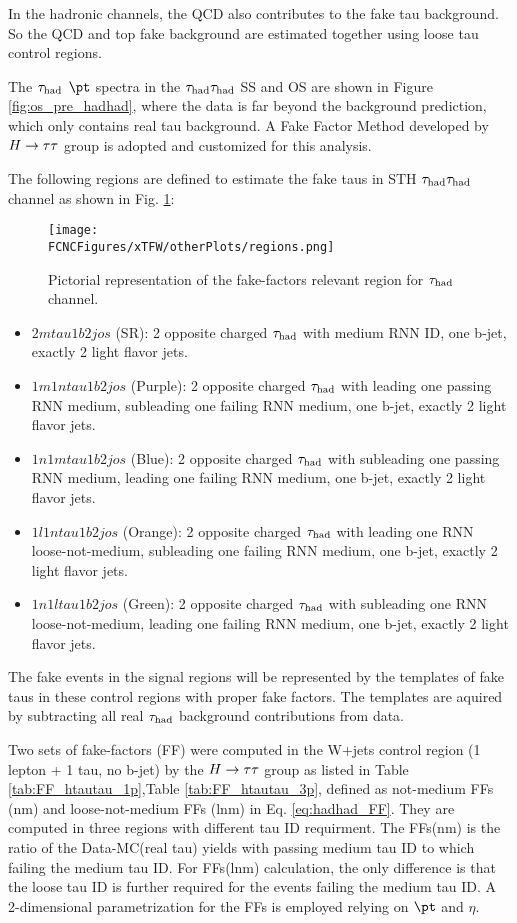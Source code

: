 In the hadronic channels, the QCD also contributes to the fake tau background. So the QCD and top fake background are estimated together using loose tau control regions.

The $\tau_\text{had}$ $\pt$ spectra in the $\tau_\text{had}{}\tau_\text{had}$ SS and OS are shown in Figure \ref{fig:os_pre_hadhad}, where the data is far beyond the background prediction, which only contains real tau background. A Fake Factor Method developed by $H \rightarrow \tau\tau$ group \cite{Htautau-note} is adopted and customized for this analysis. 

The following regions are defined to estimate the fake taus in STH $\tau_\text{had}{}\tau_\text{had}$ channel as shown in Fig. \ref{fig:regions_hadhad}:

\begin{figure}[htb]
\centering
\texttt{[image: \\FCNCFigures/xTFW/otherPlots/regions.png]}
\caption{Pictorial representation of the fake-factors relevant region for $\tau_\text{had}$ channel.}
\label{fig:regions_hadhad}
\end{figure}

\begin{itemize}
\item{$2mtau1b2jos$ (SR): 2 opposite charged $\tau_\text{had}$ with medium RNN ID, one b-jet, exactly 2 light flavor jets.}
\item{$1m1ntau1b2jos$ (Purple): 2 opposite charged $\tau_\text{had}$ with leading one passing RNN medium, subleading one failing RNN medium, one b-jet, exactly 2 light flavor jets.}
\item{$1n1mtau1b2jos$ (Blue): 2 opposite charged $\tau_\text{had}$ with subleading one passing RNN medium, leading one failing RNN medium, one b-jet, exactly 2 light flavor jets.}
\item{$1l1ntau1b2jos$ (Orange): 2 opposite charged $\tau_\text{had}$ with leading one RNN loose-not-medium, subleading one failing RNN medium, one b-jet, exactly 2 light flavor jets.}
\item{$1n1ltau1b2jos$ (Green): 2 opposite charged $\tau_\text{had}$ with subleading one RNN loose-not-medium, leading one failing RNN medium, one b-jet, exactly 2 light flavor jets.}
\end{itemize}

The fake events in the signal regions will be represented by the templates of fake taus in these control regions with proper fake factors. The templates are aquired by subtracting all real $\tau_\text{had}$ background contributions from data.

Two sets of fake-factors (FF) were computed in the W+jets control region (1 lepton + 1 tau, no b-jet) by the $H \rightarrow \tau\tau$ group \cite{Htautau-note} as listed in Table \ref{tab:FF_htautau_1p},Table \ref{tab:FF_htautau_3p}, defined as not-medium FFs (nm) and loose-not-medium FFs (lnm) in Eq. \ref{eq:hadhad_FF}. They are computed in three regions with different tau ID requirment. The FFs(nm) is the ratio of the Data-MC(real tau) yields with passing medium tau ID to which failing the medium tau ID. For FFs(lnm) calculation, the only difference is that the loose tau ID is further required for the events failing the medium tau ID. A 2-dimensional parametrization for the FFs is employed relying on $\pt$ and $\eta$.



